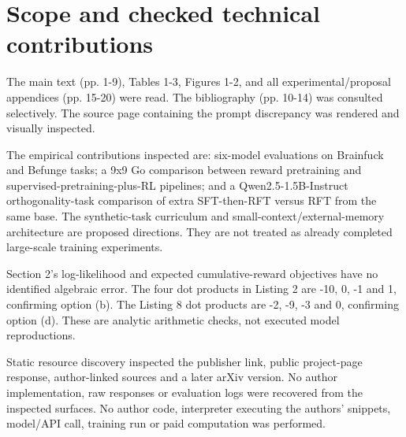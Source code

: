 \documentclass[10pt]{article}
\begin{document}
\section*{Scope and checked technical contributions}
The main text (pp. 1-9), Tables 1-3, Figures 1-2, and all experimental/proposal appendices (pp. 15-20) were read. The bibliography (pp. 10-14) was consulted selectively. The source page containing the prompt discrepancy was rendered and visually inspected.\par
The empirical contributions inspected are: six-model evaluations on Brainfuck and Befunge tasks; a 9x9 Go comparison between reward pretraining and supervised-pretraining-plus-RL pipelines; and a Qwen2.5-1.5B-Instruct orthogonality-task comparison of extra SFT-then-RFT versus RFT from the same base. The synthetic-task curriculum and small-context/external-memory architecture are proposed directions. They are not treated as already completed large-scale training experiments.\par
Section 2’s log-likelihood and expected cumulative-reward objectives have no identified algebraic error. The four dot products in Listing 2 are -10, 0, -1 and 1, confirming option (b). The Listing 8 dot products are -2, -9, -3 and 0, confirming option (d). These are analytic arithmetic checks, not executed model reproductions.\par
Static resource discovery inspected the publisher link, public project-page response, author-linked sources and a later arXiv version. No author implementation, raw responses or evaluation logs were recovered from the inspected surfaces. No author code, interpreter executing the authors’ snippets, model/API call, training run or paid computation was performed.\par
\end{document}
